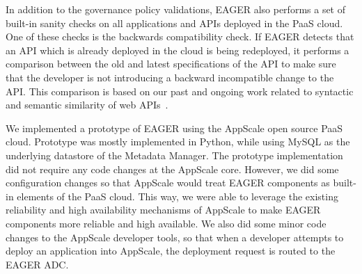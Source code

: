 In addition to the governance policy validations, EAGER also performs a set of built-in
sanity checks on all applications and APIs deployed in the PaaS cloud. One of these checks
is the backwards compatibility check. If EAGER detects that an API which is already deployed in
the cloud is being redeployed, it performs a comparison between the old
and latest specifications of the API to make sure that the developer is not introducing a backward
incompatible change to the API. This comparison is based on our past and ongoing work related
to syntactic and semantic similarity of web APIs~\cite{6930607}.

We implemented a prototype of EAGER using the AppScale open source PaaS cloud.  Prototype
was mostly implemented in Python, while using MySQL as the underlying datastore of the 
Metadata Manager. The prototype implementation did not require any code changes at the AppScale core.
However, we did some configuration changes so that AppScale would treat
EAGER components as built-in elements of the PaaS cloud. This way, we 
were able to leverage the existing reliability and high availability mechanisms of AppScale to make 
EAGER components more reliable and high available. We also did some minor code changes to the
AppScale developer tools, so that when a developer attempts to deploy an application into AppScale,
the deployment request is routed to the EAGER ADC.